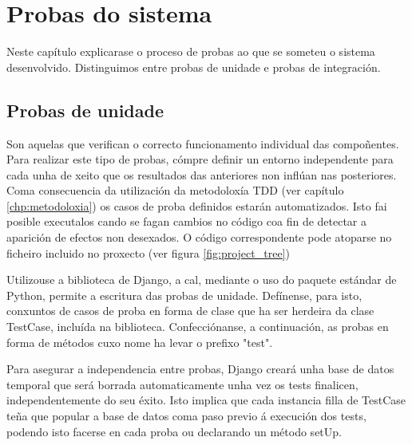 \chapter[Probas do sistema]{
  \label{chp:test}
  Probas do sistema
}
\minitoc
\newpage

Neste capítulo explicarase o proceso de probas ao que se someteu o sistema desenvolvido. Distinguimos entre probas de unidade e probas de integración.

\section{Probas de unidade}

Son aquelas que verifican o correcto funcionamento individual das compoñentes. Para realizar este tipo de probas, cómpre definir un entorno independente para cada unha de xeito que os resultados das anteriores non inflúan nas posteriores. Coma consecuencia da utilización da metodoloxía TDD (ver capítulo \ref{chp:metodoloxia}) os casos de proba definidos estarán automatizados. Isto fai posible executalos cando se fagan cambios no código coa fin de detectar a aparición de efectos non desexados. O código correspondente pode atoparse no ficheiro  incluido no proxecto (ver figura \ref{fig:project_tree})

Utilizouse a biblioteca  de Django, a cal, mediante o uso do paquete  estándar de Python, permite a escritura das probas de unidade. Defínense, para isto, conxuntos de casos de proba en forma de clase que ha ser herdeira da clase TestCase, incluída na biblioteca. Confecciónanse, a continuación, as probas en forma de métodos cuxo nome ha levar o prefixo "test".

Para asegurar a independencia entre probas, Django creará unha base de datos temporal que será borrada automaticamente unha vez os tests finalicen, independentemente do seu éxito. Isto implica que cada instancia filla de TestCase teña que popular a base de datos coma paso previo á execución dos tests, podendo isto facerse en cada proba ou declarando un método setUp.


